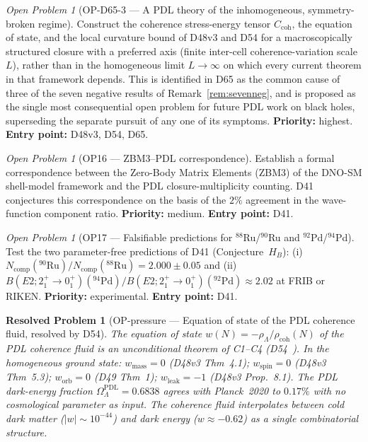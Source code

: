 \documentclass[11pt,a4paper]{article}
\newtheorem{resolvedproblem}{Resolved Problem}
\theoremstyle{plain}
\theoremstyle{definition}
\theoremstyle{remark}
\newtheorem{openproblem}[theorem]{Open Problem}
\newcommand{\rhocoh}{\rho_{\mathrm{coh}}}
\newcommand{\Ccoh}{C_{\mathrm{coh}}}
\begin{document}
\begin{openproblem}[OP-D65-3 --- A PDL theory of the inhomogeneous, symmetry-broken regime]
\label{op:D65three}
Construct the coherence stress-energy tensor $\Ccoh$, the equation of state, and the local curvature bound of D48v3 and D54 for a macroscopically structured closure with a preferred axis (finite inter-cell coherence-variation scale $L$), rather than in the homogeneous limit $L\to\infty$ on which every current theorem in that framework depends. This is identified in D65 as the common cause of three of the seven negative results of Remark~\ref{rem:sevenneg}, and is proposed as the single most consequential open problem for future PDL work on black holes, superseding the separate pursuit of any one of its symptoms. \textbf{Priority:} highest. \textbf{Entry point:} D48v3, D54, D65.
\end{openproblem}

\begin{openproblem}[OP16 --- ZBM3--PDL correspondence]
\label{op:ZBM3}
Establish a formal correspondence between the Zero-Body Matrix Elements (ZBM3) of the DNO-SM shell-model framework and the PDL closure-multiplicity counting. D41 conjectures this correspondence on the basis of the $2\%$ agreement in the wave-function component ratio. \textbf{Priority:} medium. \textbf{Entry point:} D41.
\end{openproblem}

\begin{openproblem}[OP17 --- Falsifiable predictions for $^{88}$Ru/$^{90}$Ru and $^{92}$Pd/$^{94}$Pd]
\label{op:FRIB}
Test the two parameter-free predictions of D41 (Conjecture~$H_B$): (i) $N_{\mathrm{comp}}(^{90}\mathrm{Ru})/N_{\mathrm{comp}}(^{88}\mathrm{Ru})=2.000\pm0.05$ and (ii) $B(E2;2^+_1\!\to\!0^+_1)(^{94}\mathrm{Pd})/B(E2;2^+_1\!\to\!0^+_1)(^{92}\mathrm{Pd})\approx 2.02$ at FRIB or RIKEN. \textbf{Priority:} experimental. \textbf{Entry point:} D41.
\end{openproblem}

\begin{resolvedproblem}[OP-pressure --- Equation of state of the PDL coherence fluid, resolved by D54]
\label{op:pressure}
The equation of state $w(N) = -\rho_\Lambda/\rhocoh(N)$ of the PDL coherence fluid is an unconditional theorem of C1--C4 (D54~\cite{D54}). In the homogeneous ground state: $w_{\mathrm{mass}} = 0$ (D48v3 Thm~4.1); $w_{\mathrm{spin}} = 0$ (D48v3 Thm~5.3); $w_{\mathrm{orb}} = 0$ (D49 Thm~1); $w_{\mathrm{leak}} = -1$ (D48v3 Prop.~8.1). The PDL dark-energy fraction $\Omega_\Lambda^{\mathrm{PDL}} = 0.6838$ agrees with Planck~2020 to $0.17\%$ with no cosmological parameter as input. The coherence fluid interpolates between cold dark matter ($|w| \sim 10^{-44}$) and dark energy ($w \approx -0.62$) as a single combinatorial structure.
\end{resolvedproblem}
\end{document}
